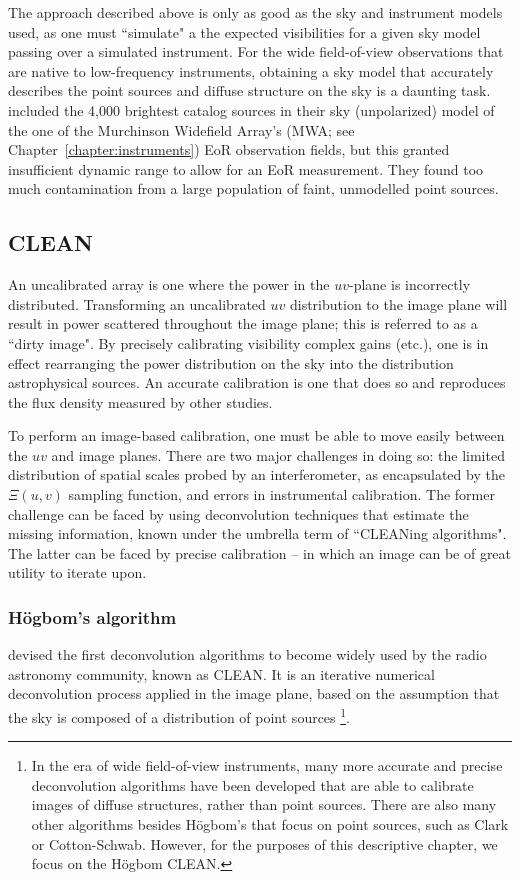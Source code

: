 The approach described above is only as good as the sky and instrument models used, as one must ``simulate" a the expected visibilities for a given sky model passing over a simulated instrument. For the wide field-of-view observations that are native to low-frequency instruments, obtaining a sky model that accurately describes the point sources and diffuse structure on the sky is a daunting task. \cite{Barry.16} included the 4,000 brightest catalog sources in their sky (unpolarized) model of the one of the Murchinson Widefield Array's (MWA; see Chapter~\ref{chapter:instruments}) EoR observation fields, but this granted insufficient dynamic range to allow for an EoR measurement. They found too much contamination from a large population of faint, unmodelled point sources.

\subsection{CLEAN}

An uncalibrated array is one where the power in the $uv$-plane is incorrectly distributed. Transforming an uncalibrated $uv$ distribution to the image plane will result in power scattered throughout the image plane; this is referred to as a ``dirty image". By precisely calibrating visibility complex gains (etc.), one is in effect rearranging the power distribution on the sky into the distribution astrophysical sources. An accurate calibration is one that does so and reproduces the flux density measured by other studies.

To perform an image-based calibration, one must be able to move easily between the $uv$ and image planes. There are two major challenges in doing so: the limited distribution of spatial scales probed by an interferometer, as encapsulated by the $\Xi(u,v)$ sampling function, and errors in instrumental calibration. The former challenge can be faced by using deconvolution techniques that estimate the missing information, known under the umbrella term of ``CLEANing algorithms". The latter can be faced by precise calibration -- in which an image can be of great utility to iterate upon. 

\subsubsection{H{\"o}gbom's algorithm}

\cite{Hogbom.74} devised the first deconvolution algorithms to become widely used by the radio astronomy community, known as CLEAN. It is an iterative numerical deconvolution process applied in the image plane, based on the assumption that the sky is composed of a distribution of point sources
\footnote{In the era of wide field-of-view instruments, many more accurate and precise deconvolution algorithms have been developed that are able to calibrate images of diffuse structures, rather than point sources. There are also many other algorithms besides H{\"o}gbom's that focus on point sources, such as Clark or Cotton-Schwab. However, for the purposes of this descriptive chapter, we focus on the H{\"o}gbom CLEAN.}.

